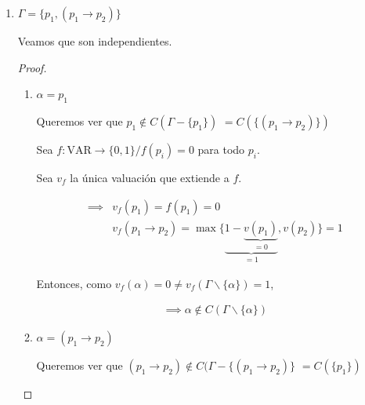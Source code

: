 \begin{enumerate}
    \item $\Gamma = \{ p_1, (p_1 \to p_2)\}$

        Veamos que son independientes.

        \begin{proof} \phantom{.}
        \begin{enumerate}[%
                        labelindent=*,
                        style=multiline,
                        leftmargin=*,
                        align=left,
                        leftmargin=2\parindent,
                        label=Caso \arabic*)]
            \item $\alpha = p_1$ 

                Queremos ver que
                $p_1 \notin C(\Gamma - \{ p_1 \})$
                $= C\left(\{(p_1\to p_2)\}\right)$
                
                    Sea $f:\mathrm{VAR}\to \{ 0,1 \} / f(p_i)=0$ 
                    para todo $p_i$.

                    Sea $v_f$ la única valuación que extiende a $f$.

                    \begin{align*}
                        \implies& v_f(p_1) = f(p_1) = 0 \\
                        & v_f(p_1\to p_2) = \max \{ 
                        \underbrace{1-\underbrace{v(p_1)}_{=0}}_{=1},v(p_2)\}
                        = 1
                    \end{align*}

                    Entonces, como 
                    $v_f(\alpha) = 0 \neq 
                    v_f(\Gamma \backslash \{ \alpha \}) = 1$,

                    \begin{gather*}
                        \implies 
                        \alpha \notin C(\Gamma \backslash \{ \alpha \})
                    \end{gather*}

            \item $\alpha = (p_1 \to p_2)$ 

                Queremos ver que
                $(p_1 \to p_2) \notin C(\Gamma - \{ (p_1\to p_2) \}$
                $= C(\{ p_1 \})$


\end{enumerate}
\end{proof}
\end{enumerate}
